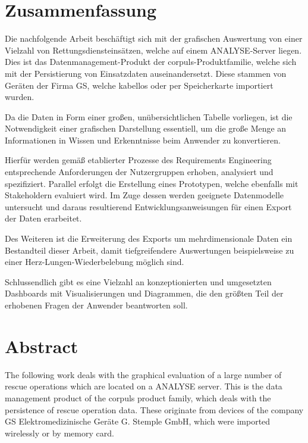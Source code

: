 \newpage\thispagestyle{empty}
\section*{Zusammenfassung}

Die nachfolgende Arbeit beschäftigt sich mit der grafischen Auswertung von einer Vielzahl von Rettungsdiensteinsätzen, welche auf einem \acrlong{ANALYSE}-Server liegen.
Dies ist das Datenmanagement-Produkt der \textsf{corpuls\color{corpulsred}{.web}}-Produktfamilie, welche sich mit der Persistierung von Einsatzdaten auseinandersetzt.
Diese stammen von Geräten der Firma \acrlong{GS}, welche kabellos oder per Speicherkarte importiert wurden.

Da die Daten in Form einer großen, unübersichtlichen Tabelle vorliegen, ist die Notwendigkeit einer grafischen Darstellung essentiell, um die große Menge an Informationen in Wissen und Erkenntnisse beim Anwender zu konvertieren.

Hierfür werden gemäß etablierter Prozesse des Requirements Engineering entsprechende Anforderungen der Nutzergruppen erhoben, analysiert und spezifiziert.
Parallel erfolgt die Erstellung eines Prototypen, welche ebenfalls mit Stakeholdern evaluiert wird.
Im Zuge dessen werden geeignete Datenmodelle untersucht und daraus resultierend Entwicklungsanweisungen für einen Export der Daten erarbeitet.

Des Weiteren ist die Erweiterung des Exports um mehrdimensionale Daten ein Bestandteil dieser Arbeit, damit tiefgreifendere Auswertungen beispielsweise zu einer Herz-Lungen-Wiederbelebung möglich sind.

Schlussendlich gibt es eine Vielzahl an konzeptionierten und umgesetzten Dashboards mit Visualisierungen und Diagrammen, die den größten Teil der erhobenen Fragen der Anwender beantworten soll.

\section*{Abstract}
The following work deals with the graphical evaluation of a large number of
rescue operations which are located on a \acrlong{ANALYSE} server.
This is the data management product of the \textsf{corpuls\color{corpulsred}{.web}} product family, which deals with the persistence of rescue operation data.
These originate from devices of the company GS Elektromedizinische Geräte G. Stemple GmbH, which were imported wirelessly or by memory card.

